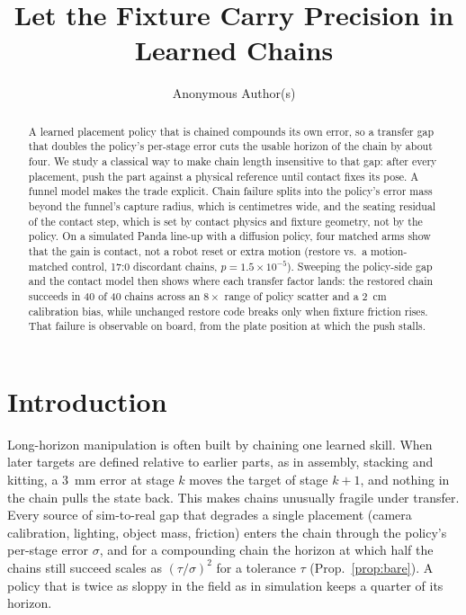 \documentclass{article}
\title{Let the Fixture Carry Precision in Learned Chains}
\author{Anonymous Author(s)}
\begin{document}
\maketitle

\begin{abstract}
A learned placement policy that is chained compounds its own error, so a transfer gap that doubles the policy's
per-stage error cuts the usable horizon of the chain by about four. We study a classical way to make chain length
insensitive to that gap: after every placement, push the part against a physical reference until contact fixes its
pose. A funnel model makes the trade explicit. Chain failure splits into the policy's error mass beyond the
funnel's capture radius, which is centimetres wide, and the seating residual of the contact step, which is set by
contact physics and fixture geometry, not by the policy. On a simulated Panda line-up with a diffusion policy, four
matched arms show that the gain is contact, not a robot reset or extra motion (restore vs.\ a motion-matched
control, 17:0 discordant chains, $p=1.5\times10^{-5}$). Sweeping the policy-side gap and the
contact model then shows where each transfer factor lands: the restored chain succeeds in 40 of 40 chains across an
$8\times$ range of policy scatter and a 2~cm calibration bias, while unchanged restore code breaks only when fixture
friction rises. That failure is observable on board, from the plate position at which the push stalls.
\end{abstract}


\section{Introduction}
Long-horizon manipulation is often built by chaining one learned skill. When later targets are defined relative
to earlier parts, as in assembly, stacking and kitting, a 3~mm error at stage $k$ moves the target of stage $k+1$,
and nothing in the chain pulls the state back. This makes chains unusually fragile under transfer. Every source
of sim-to-real gap that degrades a single placement (camera calibration, lighting, object mass, friction) enters
the chain through the policy's per-stage error $\sigma$, and for a compounding chain the horizon at which half the
chains still succeed scales as $(\tau/\sigma)^2$ for a tolerance $\tau$ (Prop.~\ref{prop:bare}). A policy that is
twice as sloppy in the field as in simulation keeps a quarter of its horizon.
\end{document}
